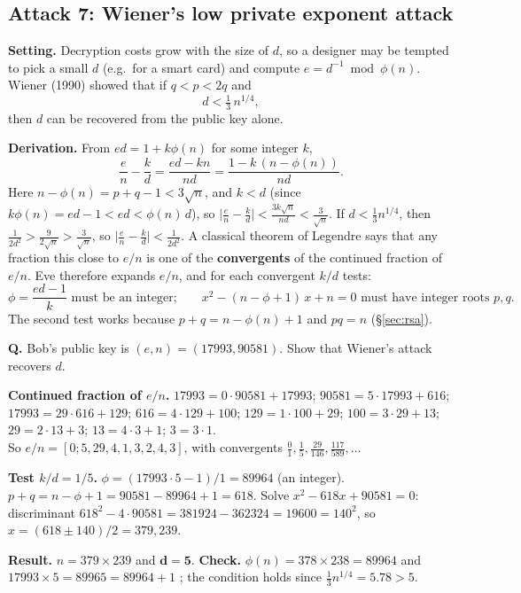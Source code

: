 \subsection{Attack 7: Wiener's low private exponent attack \new}

\textbf{Setting.} Decryption costs grow with the size of $d$, so a designer may be tempted to pick a small $d$ (e.g.\ for a smart card) and compute $e = d^{-1} \bmod \phi(n)$. Wiener (1990) showed that if $q < p < 2q$ and
\[
d < \tfrac13\, n^{1/4},
\]
then $d$ can be recovered from the public key alone.

\textbf{Derivation.} From $ed = 1 + k\phi(n)$ for some integer $k$,
\[
\frac{e}{n} - \frac{k}{d} = \frac{ed - kn}{nd} = \frac{1 - k\,(n - \phi(n))}{nd}.
\]
Here $n - \phi(n) = p + q - 1 < 3\sqrt n$, and $k < d$ (since $k\phi(n) = ed - 1 < ed < \phi(n)\, d$), so $\big|\frac{e}{n} - \frac{k}{d}\big| < \frac{3k\sqrt n}{nd} < \frac{3}{\sqrt n}$. If $d < \frac13 n^{1/4}$, then $\frac{1}{2d^2} > \frac{9}{2\sqrt n} > \frac{3}{\sqrt n}$, so $\big|\frac{e}{n} - \frac{k}{d}\big| < \frac{1}{2d^2}$. A classical theorem of Legendre says that any fraction this close to $e/n$ is one of the \textbf{convergents} of the continued fraction of $e/n$. Eve therefore expands $e/n$, and for each convergent $k/d$ tests:
\[
\phi = \frac{ed - 1}{k} \text{ must be an integer;}\qquad x^2 - (n - \phi + 1)\,x + n = 0 \text{ must have integer roots } p, q.
\]
The second test works because $p + q = n - \phi(n) + 1$ and $pq = n$ (\S\ref{sec:rsa}).

\begin{worked}
\textbf{Q.} Bob's public key is $(e, n) = (17993, 90581)$. Show that Wiener's attack recovers $d$.

\textbf{Continued fraction of $e/n$.} $17993 = 0 \cdot 90581 + 17993$; $90581 = 5 \cdot 17993 + 616$; $17993 = 29 \cdot 616 + 129$; $616 = 4 \cdot 129 + 100$; $129 = 1 \cdot 100 + 29$; $100 = 3 \cdot 29 + 13$; $29 = 2 \cdot 13 + 3$; $13 = 4 \cdot 3 + 1$; $3 = 3 \cdot 1$.\\
So $e/n = [0; 5, 29, 4, 1, 3, 2, 4, 3]$, with convergents $\frac01, \frac15, \frac{29}{146}, \frac{117}{589}, \dots$

\textbf{Test $k/d = 1/5$.} $\phi = (17993 \cdot 5 - 1)/1 = 89964$ (an integer). $p + q = n - \phi + 1 = 90581 - 89964 + 1 = 618$. Solve $x^2 - 618x + 90581 = 0$: discriminant $618^2 - 4 \cdot 90581 = 381924 - 362324 = 19600 = 140^2$, so $x = (618 \pm 140)/2 = 379, 239$.

\textbf{Result.} $n = 379 \times 239$ and $\mathbf{d = 5}$. \textbf{Check.} $\phi(n) = 378 \times 238 = 89964$ and $17993 \times 5 = 89965 = 89964 + 1$ \checkmark; the condition holds since $\frac13 n^{1/4} = 5.78 > 5$.
\end{worked}

